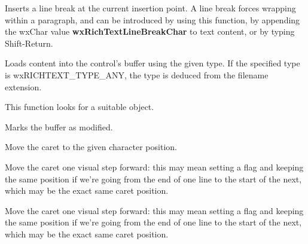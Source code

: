 Inserts a line break at the current insertion point. A line break forces wrapping within a paragraph, and
can be introduced by using this function, by appending the wxChar value {\bf wxRichTextLineBreakChar} to text content,
or by typing Shift-Return.

\label{wxrichtextctrlloadfile}


Loads content into the control's buffer using the given type. If the specified type
is wxRICHTEXT\_TYPE\_ANY, the type is deduced from the filename extension.

This function looks for a suitable  object.

\label{wxrichtextctrlmarkdirty}


Marks the buffer as modified.

\label{wxrichtextctrlmovecaret}


Move the caret to the given character position.

\label{wxrichtextctrlmovecaretback}


Move the caret one visual step forward: this may mean setting a flag
and keeping the same position if we're going from the end of one line
to the start of the next, which may be the exact same caret position.

\label{wxrichtextctrlmovecaretforward}


Move the caret one visual step forward: this may mean setting a flag
and keeping the same position if we're going from the end of one line
to the start of the next, which may be the exact same caret position.

\label{wxrichtextctrlmovedown}



